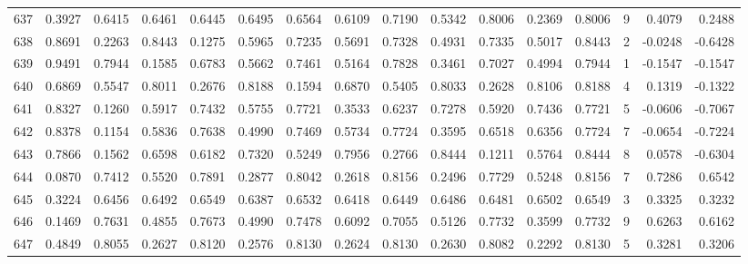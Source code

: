 \begin{tabular}{lrrrrrrrrrrrrrrr}
637 &      0.3927 &  0.6415 &  0.6461 &  0.6445 &  0.6495 &  0.6564 &  0.6109 &  0.7190 &  0.5342 &  0.8006 &   0.2369 &     0.8006 &      9 &                    0.4079 &                     0.2488 \\
638 &      0.8691 &  0.2263 &  0.8443 &  0.1275 &  0.5965 &  0.7235 &  0.5691 &  0.7328 &  0.4931 &  0.7335 &   0.5017 &     0.8443 &      2 &                   -0.0248 &                    -0.6428 \\
639 &      0.9491 &  0.7944 &  0.1585 &  0.6783 &  0.5662 &  0.7461 &  0.5164 &  0.7828 &  0.3461 &  0.7027 &   0.4994 &     0.7944 &      1 &                   -0.1547 &                    -0.1547 \\
640 &      0.6869 &  0.5547 &  0.8011 &  0.2676 &  0.8188 &  0.1594 &  0.6870 &  0.5405 &  0.8033 &  0.2628 &   0.8106 &     0.8188 &      4 &                    0.1319 &                    -0.1322 \\
641 &      0.8327 &  0.1260 &  0.5917 &  0.7432 &  0.5755 &  0.7721 &  0.3533 &  0.6237 &  0.7278 &  0.5920 &   0.7436 &     0.7721 &      5 &                   -0.0606 &                    -0.7067 \\
642 &      0.8378 &  0.1154 &  0.5836 &  0.7638 &  0.4990 &  0.7469 &  0.5734 &  0.7724 &  0.3595 &  0.6518 &   0.6356 &     0.7724 &      7 &                   -0.0654 &                    -0.7224 \\
643 &      0.7866 &  0.1562 &  0.6598 &  0.6182 &  0.7320 &  0.5249 &  0.7956 &  0.2766 &  0.8444 &  0.1211 &   0.5764 &     0.8444 &      8 &                    0.0578 &                    -0.6304 \\
644 &      0.0870 &  0.7412 &  0.5520 &  0.7891 &  0.2877 &  0.8042 &  0.2618 &  0.8156 &  0.2496 &  0.7729 &   0.5248 &     0.8156 &      7 &                    0.7286 &                     0.6542 \\
645 &      0.3224 &  0.6456 &  0.6492 &  0.6549 &  0.6387 &  0.6532 &  0.6418 &  0.6449 &  0.6486 &  0.6481 &   0.6502 &     0.6549 &      3 &                    0.3325 &                     0.3232 \\
646 &      0.1469 &  0.7631 &  0.4855 &  0.7673 &  0.4990 &  0.7478 &  0.6092 &  0.7055 &  0.5126 &  0.7732 &   0.3599 &     0.7732 &      9 &                    0.6263 &                     0.6162 \\
647 &      0.4849 &  0.8055 &  0.2627 &  0.8120 &  0.2576 &  0.8130 &  0.2624 &  0.8130 &  0.2630 &  0.8082 &   0.2292 &     0.8130 &      5 &                    0.3281 &                     0.3206 \\

\end{tabular}
